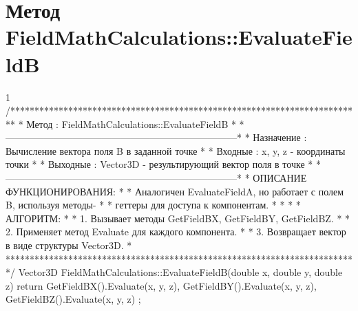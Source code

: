 \section{Метод FieldMathCalculations::EvaluateFieldB}
\footnotesize
\begin{listing}{1}
/*************************************************************************
* Метод         : FieldMathCalculations::EvaluateFieldB                  *
*------------------------------------------------------------------------*
* Назначение    : Вычисление вектора поля B в заданной точке             *
* Входные       : x, y, z - координаты точки                             *
* Выходные      : Vector3D - результирующий вектор поля в точке          *
*------------------------------------------------------------------------*
* ОПИСАНИЕ ФУНКЦИОНИРОВАНИЯ:                                             *
* Аналогичен EvaluateFieldA, но работает с полем B, используя методы-    *
* геттеры для доступа к компонентам.                                     *
* *
* АЛГОРИТМ:                                                              *
* 1. Вызывает методы GetFieldBX, GetFieldBY, GetFieldBZ.                 *
* 2. Применяет метод Evaluate для каждого компонента.                    *
* 3. Возвращает вектор в виде структуры Vector3D.                        *
*************************************************************************/
Vector3D FieldMathCalculations::EvaluateFieldB(double x, double y, double z) {
    return { GetFieldBX().Evaluate(x, y, z), 
             GetFieldBY().Evaluate(x, y, z), 
             GetFieldBZ().Evaluate(x, y, z) };
}
\end{listing}
\normalsize

\pagebreak

